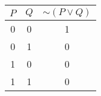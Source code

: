 \begin{tabular}{|c|c||c|}
\hline
$ P $ & $ Q $ & $  \sim (P \vee Q) $ \\
\hline
0 & 0 & 1 \\
0 & 1 & 0 \\
1 & 0 & 0 \\
1 & 1 & 0 \\
\hline
\end{tabular}
\label{table:tt1}
